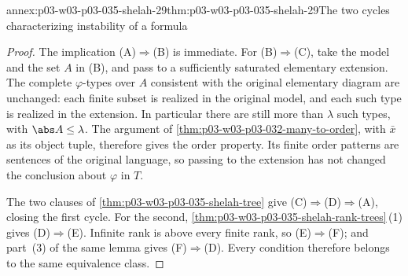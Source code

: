 \begin{annexitem}{annex:p03-w03-p03-035-shelah-29}{thm:p03-w03-p03-035-shelah-29}{The two cycles characterizing instability of a formula}
\begin{proof}
The implication (A)\(\Rightarrow\)(B) is immediate.  For
(B)\(\Rightarrow\)(C), take the model and the set \(A\) in (B), and pass
to a sufficiently saturated elementary extension.  The complete
\(\varphi\)-types over \(A\) consistent with the original elementary
diagram are unchanged: each finite subset is realized in the original
model, and each such type is realized in the extension.  In particular
there are still more than \(\lambda\) such types, with
\(\abs A\leq\lambda\).  The argument of
\cref{thm:p03-w03-p03-032-many-to-order}, with \(\bar x\) as its object
tuple, therefore gives the order property.  Its finite order patterns are
sentences of the original language, so passing to the extension has not
changed the conclusion about \(\varphi\) in \(T\).

The two clauses of \cref{thm:p03-w03-p03-035-shelah-tree} give
(C)\(\Rightarrow\)(D)\(\Rightarrow\)(A), closing the first cycle.
For the second, \cref{thm:p03-w03-p03-035-shelah-rank-trees}\,(1) gives
(D)\(\Rightarrow\)(E).  Infinite rank is above every finite rank, so
(E)\(\Rightarrow\)(F); and part~(3) of the same lemma gives
(F)\(\Rightarrow\)(D).  Every condition therefore belongs to the same
equivalence class.
\end{proof}
\end{annexitem}


